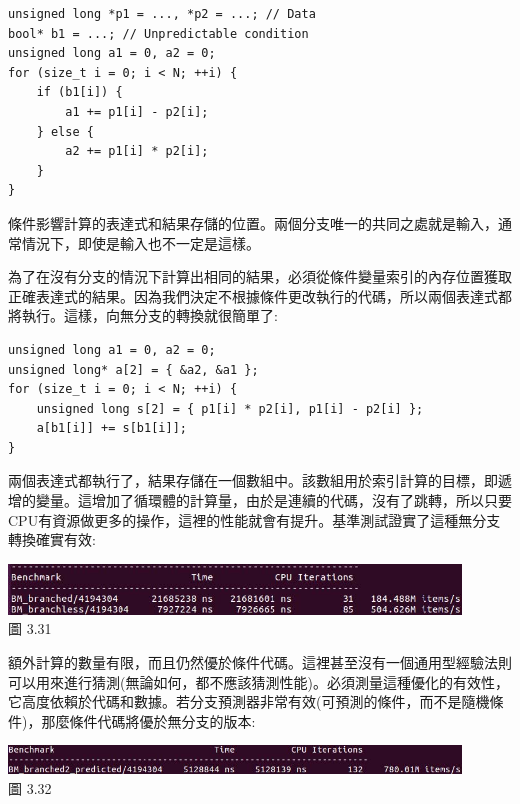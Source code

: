\begin{lstlisting}[style=styleCXX]
unsigned long *p1 = ..., *p2 = ...; // Data
bool* b1 = ...; // Unpredictable condition
unsigned long a1 = 0, a2 = 0;
for (size_t i = 0; i < N; ++i) {
	if (b1[i]) {
		a1 += p1[i] - p2[i];
	} else {
		a2 += p1[i] * p2[i];
	}
}
\end{lstlisting}

條件影響計算的表達式和結果存儲的位置。兩個分支唯一的共同之處就是輸入，通常情況下，即使是輸入也不一定是這樣。

為了在沒有分支的情況下計算出相同的結果，必須從條件變量索引的內存位置獲取正確表達式的結果。因為我們決定不根據條件更改執行的代碼，所以兩個表達式都將執行。這樣，向無分支的轉換就很簡單了:

\begin{lstlisting}[style=styleCXX]
unsigned long a1 = 0, a2 = 0;
unsigned long* a[2] = { &a2, &a1 };
for (size_t i = 0; i < N; ++i) {
	unsigned long s[2] = { p1[i] * p2[i], p1[i] - p2[i] };
	a[b1[i]] += s[b1[i]];
}
\end{lstlisting}

兩個表達式都執行了，結果存儲在一個數組中。該數組用於索引計算的目標，即遞增的變量。這增加了循環體的計算量，由於是連續的代碼，沒有了跳轉，所以只要CPU有資源做更多的操作，這裡的性能就會有提升。基準測試證實了這種無分支轉換確實有效:

\begin{center}
\includegraphics[width=0.9\textwidth]{content/1/chapter3/images/31.jpg}\\
圖 3.31
\end{center}

額外計算的數量有限，而且仍然優於條件代碼。這裡甚至沒有一個通用型經驗法則可以用來進行猜測(無論如何，都不應該猜測性能)。必須測量這種優化的有效性，它高度依賴於代碼和數據。若分支預測器非常有效(可預測的條件，而不是隨機條件)，那麼條件代碼將優於無分支的版本:

\begin{center}
\includegraphics[width=0.9\textwidth]{content/1/chapter3/images/32.jpg}\\
圖 3.32
\end{center}

